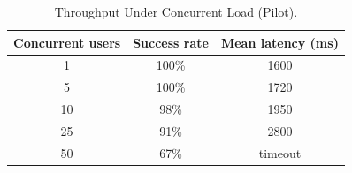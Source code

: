 \begin{table}[htbp]
\caption{Throughput Under Concurrent Load (Pilot).}
\label{tab:throughput}
\centering
\begin{tabular}{ccc}
\toprule
\textbf{Concurrent users} & \textbf{Success rate} & \textbf{Mean latency (ms)} \\
\midrule
1   & 100\% & 1600 \\
5   & 100\% & 1720 \\
10  & 98\%  & 1950 \\
25  & 91\%  & 2800 \\
50  & 67\%  & timeout \\
\bottomrule
\end{tabular}
\end{table}
